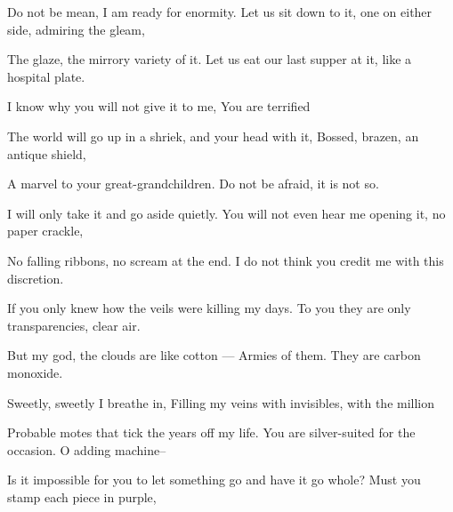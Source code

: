 \documentclass[10pt]{article}
\begin{document}
\begin{poem}
  \begin{stanza}
    Do not be mean, I am ready for enormity.\verseline
    Let us sit down to it, one on either side, admiring the gleam,
  \end{stanza}
  \begin{stanza}
    The glaze, the mirrory variety of it.\verseline
    Let us eat our last supper at it, like a hospital plate.
  \end{stanza}
  \begin{stanza}
    I know why you will not give it to me,\verseline
    You are terrified
  \end{stanza}
  \begin{stanza}
    The world will go up in a shriek, and your head with it,\verseline
    Bossed, brazen, an antique shield,
  \end{stanza}
  \begin{stanza}
    A marvel to your great-grandchildren.\verseline
    Do not be afraid, it is not so.
  \end{stanza}
  \begin{stanza}
    I will only take it and go aside quietly.\verseline
    You will not even hear me opening it, no paper crackle,
  \end{stanza}
  \begin{stanza}
    No falling ribbons, no scream at the end.\verseline
    I do not think you credit me with this discretion.
  \end{stanza}
  \begin{stanza}
    If you only knew how the veils were killing my days.\verseline
    To you they are only transparencies, clear air.
  \end{stanza}
  \begin{stanza}
    But my god, the clouds are like cotton ---\verseline
    Armies of them. They are carbon monoxide.
  \end{stanza}
  \begin{stanza}
    Sweetly, sweetly I breathe in,\verseline
    Filling my veins with invisibles, with the million
  \end{stanza}
  \begin{stanza}
    Probable motes that tick the years off my life.\verseline
    You are silver-suited for the occasion. O adding machine--
  \end{stanza}
  \begin{stanza}
    Is it impossible for you to let something go and have it go whole?\verseline
    Must you stamp each piece in purple,
  \end{stanza}

\end{poem}
\end{document}
